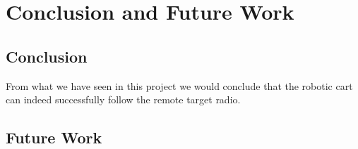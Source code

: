 \chapter{Conclusion and Future Work}
\label{ch: Chapter6}

\section{Conclusion}

From what we have seen in this project we would conclude that the robotic cart can indeed successfully follow the remote target radio.


  

\section{Future Work}



